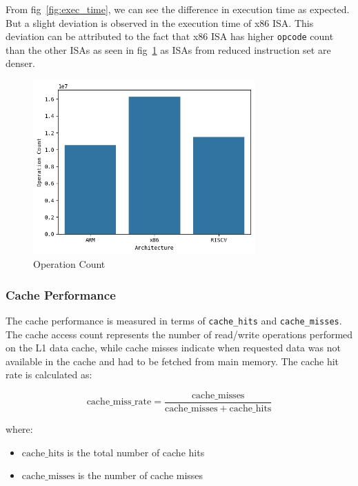 From fig~\ref{fig:exec_time}, we can see the difference in execution time as expected. But a slight deviation is observed in the execution time of x86 ISA. This deviation can be attributed to the fact that x86 ISA has higher \texttt{opcode} count than the other ISAs as seen in fig~\ref{fig:op_count} as ISAs from reduced instruction set are denser.
\begin{figure}[h]
	\centering
	\includegraphics[width=8.5cm]{figs/op_count.png}
	\caption{Operation Count}
	\label{fig:op_count}
\end{figure}

\subsubsection{Cache Performance}

The cache performance is measured in terms of \texttt{cache\_hits} and \texttt{cache\_misses}. The cache access count represents the number of read/write operations performed on the L1 data cache, while cache misses indicate when requested data was not available in the cache and had to be fetched from main memory. The cache hit rate is calculated as:

\begin{equation}
	\mathrm{cache\_miss\_rate} = \frac{\mathrm{cache\_misses}}{\mathrm{cache\_misses} + \mathrm{cache\_hits}}
	\label{eq:cache_miss_rate}
\end{equation}

where:
\begin{itemize}
	\item $\mathrm{cache\_hits}$ is the total number of cache hits
	\item $\mathrm{cache\_misses}$ is the number of cache misses
\end{itemize}

